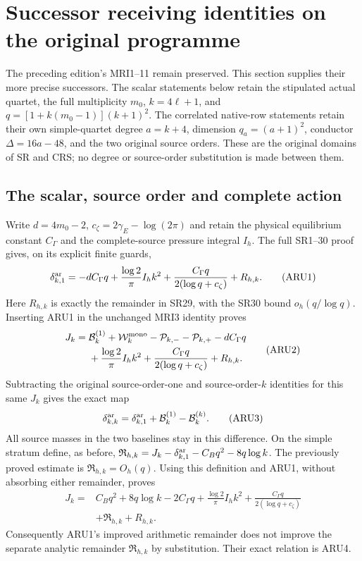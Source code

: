 \section{Successor receiving identities on the original programme}

The preceding edition's MRI1--11 remain preserved. This section supplies
their more precise successors. The scalar statements below retain the
stipulated actual quartet, the full multiplicity $m_0$, $k=4\ell+1$, and
$q=[1+k(m_0-1)](k+1)^2$. The correlated native-row statements retain their
own simple-quartet degree $a=k+4$, dimension $q_a=(a+1)^2$, conductor
$\Delta=16a-48$, and the two original source orders. These are the
original domains of SR and CRS; no degree or source-order substitution
is made between them.

\subsection{The scalar, source order and complete action}
Write $d=4m_0-2$, $c_\zeta=2\gamma_E-\log(2\pi)$ and retain the physical
equilibrium constant $C_\Gamma$ and the complete-source pressure integral
$I_h$. The full SR1--30 proof gives, on its explicit finite guards,
\[
 \delta_{k,1}^{\rm ar}=-dC_\Gamma q+
 \frac{\log2}{\pi}I_hk^2+
 \frac{C_\Gamma q}{2(\log q+c_\zeta)}+R_{h,k}.
 \tag{ARU1}
\]
Here $R_{h,k}$ is exactly the remainder in SR29, with the SR30 bound
$o_h(q/\log q)$. Inserting ARU1 in the unchanged MRI3 identity proves
\[
\begin{split}
 J_k={}&\mathcal B_k^{(1)}+\mathcal W_k^{\rm mono}
 -\mathcal P_{k,-}-\mathcal P_{k,+}-dC_\Gamma q\\
 &+\frac{\log2}{\pi}I_hk^2+
 \frac{C_\Gamma q}{2(\log q+c_\zeta)}+R_{h,k}.
\end{split}\tag{ARU2}
\]
Subtracting the original source-order-one and source-order-$k$ identities
for this same $J_k$ gives the exact map
\[
 \delta_{k,k}^{\rm ar}=\delta_{k,1}^{\rm ar}
                   +\mathcal B_k^{(1)}-\mathcal B_k^{(k)}.
 \tag{ARU3}
\]
All source masses in the two baselines stay in this difference. On the
simple stratum define, as before,
$\mathfrak R_{h,k}=J_k-\delta_{k,1}^{\rm ar}-C_Bq^2-8q\log k$.
The previously proved estimate is $\mathfrak R_{h,k}=O_h(q)$.
Using this definition and ARU1, without absorbing either remainder,
proves
\[
\begin{split}
 J_k={}&C_Bq^2+8q\log k-2C_\Gamma q+
 \frac{\log2}{\pi}I_hk^2+
 \frac{C_\Gamma q}{2(\log q+c_\zeta)}\\
 &+\mathfrak R_{h,k}+R_{h,k}.
\end{split}\tag{ARU4}
\]
Consequently ARU1's improved arithmetic remainder does not improve
the separate analytic remainder $\mathfrak R_{h,k}$ by substitution.
Their exact relation is ARU4.

